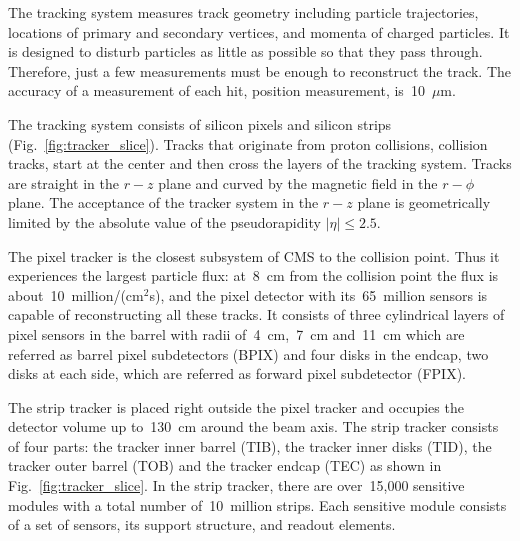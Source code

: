 The tracking system measures track geometry including particle trajectories, locations of primary and secondary vertices, and momenta of charged particles. It is designed to disturb particles as little as possible so that they pass through. Therefore, just a few measurements must be enough to reconstruct the track. The accuracy of a measurement of each hit, position measurement, is~10~$\mu$m.

The tracking system consists of silicon pixels and silicon strips (Fig.~\ref{fig:tracker_slice}). Tracks that originate from proton collisions, collision tracks, start at the center and then cross the layers of the tracking system. Tracks are straight in the $r-z$ plane and curved by the magnetic field in the $r-\phi$ plane. The acceptance of the tracker system in the $r-z$ plane is geometrically limited by the absolute value of the pseudorapidity $|\eta| \leq 2.5$.

The pixel tracker is the closest subsystem of CMS to the collision point. Thus it experiences the largest particle flux: at~8~cm from the collision point the flux is about~10~million/(cm$^2$s), and the pixel detector with its~65~million sensors is capable of reconstructing all these tracks. It consists of three cylindrical layers of pixel sensors in the barrel with radii of~4~cm,~7~cm and~11~cm which are referred as barrel pixel subdetectors (BPIX) and four disks in the endcap, two disks at each side, which are referred as forward pixel subdetector (FPIX). 


The strip tracker is placed right outside the pixel tracker and occupies the detector volume up to~130~cm around the beam axis. The strip tracker consists of four parts: the tracker inner barrel (TIB), the tracker inner disks (TID), the tracker outer barrel (TOB) and the tracker endcap (TEC) as shown in Fig.~\ref{fig:tracker_slice}. In the strip tracker, there are over~15,000 sensitive modules with a total number of~10~million strips. Each sensitive module consists of a set of sensors, its support structure, and readout elements.



